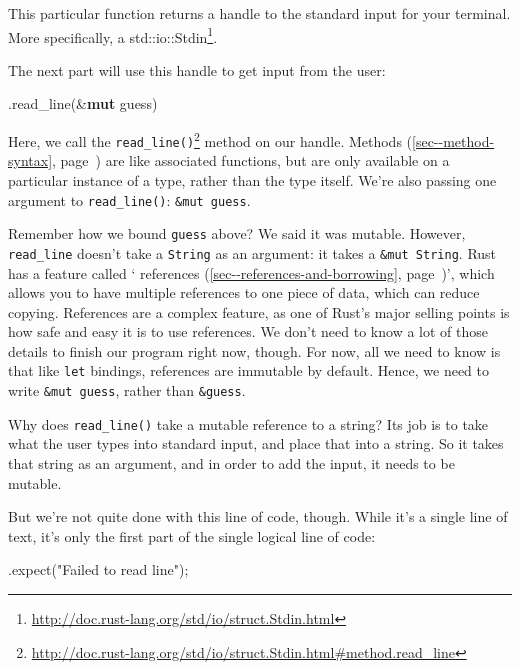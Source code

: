 \documentclass[a4paper,]{book}
\renewcommand*{\hyperlink}[2]{%
 #2 (\autoref{#1}, page~\pageref{#1})}
\newenvironment{Shaded}{\begin{snugshade}}{\end{snugshade}}
\newcommand{\KeywordTok}[1]{\textcolor[rgb]{0.13,0.29,0.53}{\textbf{{#1}}}}
\newcommand{\StringTok}[1]{\textcolor[rgb]{0.31,0.60,0.02}{{#1}}}
\newcommand{\NormalTok}[1]{{#1}}
\renewcommand{\href}[2]{#2\footnote{\url{#1}}}
\begin{document}
This particular function returns a handle to the standard input for your
terminal. More specifically, a
\href{http://doc.rust-lang.org/std/io/struct.Stdin.html}{std::io::Stdin}.

The next part will use this handle to get input from the user:

\begin{Shaded}
\begin{Highlighting}[]
\NormalTok{.read_line(&}\KeywordTok{mut} \NormalTok{guess)}
\end{Highlighting}
\end{Shaded}

Here, we call the
\href{http://doc.rust-lang.org/std/io/struct.Stdin.html\#method.read_line}{\texttt{read\_line()}}
method on our handle. \protect\hyperlink{sec--method-syntax}{Methods}
are like associated functions, but are only available on a particular
instance of a type, rather than the type itself. We're also passing one
argument to \texttt{read\_line()}: \texttt{\&mut\ guess}.

Remember how we bound \texttt{guess} above? We said it was mutable.
However, \texttt{read\_line} doesn't take a \texttt{String} as an
argument: it takes a \texttt{\&mut\ String}. Rust has a feature called
`\protect\hyperlink{sec--references-and-borrowing}{references}', which
allows you to have multiple references to one piece of data, which can
reduce copying. References are a complex feature, as one of Rust's major
selling points is how safe and easy it is to use references. We don't
need to know a lot of those details to finish our program right now,
though. For now, all we need to know is that like \texttt{let} bindings,
references are immutable by default. Hence, we need to write
\texttt{\&mut\ guess}, rather than \texttt{\&guess}.

Why does \texttt{read\_line()} take a mutable reference to a string? Its
job is to take what the user types into standard input, and place that
into a string. So it takes that string as an argument, and in order to
add the input, it needs to be mutable.

But we're not quite done with this line of code, though. While it's a
single line of text, it's only the first part of the single logical line
of code:

\begin{Shaded}
\begin{Highlighting}[]
        \NormalTok{.expect(}\StringTok{"Failed to read line"}\NormalTok{);}
\end{Highlighting}
\end{Shaded}
\end{document}
